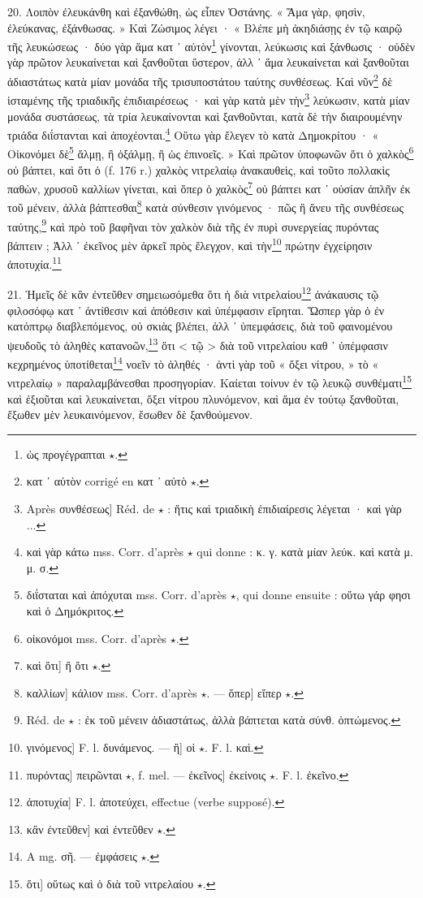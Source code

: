 \documentclass[a4paper, 11pt, oneside, polutonikogreek, french]{article}
\begin{document}
20. Λοιπὸν ἐλευκάνθη καὶ ἐξανθώθη, ὡς εἶπεν Ὀστάνης. « Ἅμα γὰρ, φησὶν, ἐλεύκανας, ἐξάνθωσας. » Καὶ Ζώσιμος λέγει · « Βλέπε μὴ ἀκηδιάσῃς ἐν τῷ καιρῷ τῆς λευκώσεως · δύο γὰρ ἅμα κατ ᾽ αὐτὸν\footnote{ὡς προγέγραπται $\star$.} γίνονται, λεύκωσις καὶ ξάνθωσις · οὐδὲν γὰρ πρῶτον λευκαίνεται καὶ ξανθοῦται ὕστερον, ἀλλ ᾽ ἅμα λευκαίνεται καὶ ξανθοῦται ἀδιαστάτως κατὰ μίαν μονάδα τῆς τρισυποστάτου ταύτης συνθέσεως. Καὶ νῦν\footnote{κατ ᾽ αὐτὸν corrigé en κατ ᾽ αὐτὸ $\star$.} δὲ ἱσταμένης τῆς τριαδικῆς ἐπιδιαιρέσεως · καὶ γὰρ κατὰ μὲν τὴν\footnote{Après συνθέσεως] Réd. de $\star$ : ἥτις καὶ τριαδικὴ ἐπιδιαίρεσις λέγεται · καὶ γὰρ ...} λεύκωσιν, κατὰ μίαν μονάδα συστάσεως, τὰ τρία λευκαίνονται καὶ ξανθοῦνται, κατὰ δὲ τὴν διαιρουμένην τριάδα διΐστανται καὶ ἀποχέονται.\footnote{καὶ γὰρ κάτω mss. Corr. d'après $\star$ qui donne : κ. γ. κατὰ μίαν λεύκ. καὶ κατὰ μ. μ. σ.} Οὕτω γὰρ ἔλεγεν τὸ κατὰ Δημοκρίτου · « Οἰκονόμει δὲ\footnote{διΐσταται καὶ ἀπόχυται mss. Corr. d'après $\star$, qui donne ensuite : οὕτω γάρ φησι καὶ ὁ Δημόκριτος.} ἅλμῃ, ἢ ὀξάλμῃ, ἢ ὡς ἐπινοεῖς. » Καὶ πρῶτον ὑποφωνῶν ὅτι ὁ χαλκὸς\footnote{οἰκονόμοι mss. Corr. d'après $\star$.} οὐ βάπτει, καὶ ὅτι ὁ (f. 176 r.) χαλκὸς νιτρελαίῳ ἀνακαυθεὶς, καὶ τοῦτο πολλακὶς παθὼν, χρυσοῦ καλλίων γίνεται, καὶ ὅπερ ὁ χαλκὸς\footnote{καὶ ὅτι] ἢ ὅτι $\star$.} οὐ βάπτει κατ ᾽ οὐσίαν ἁπλῆν ἐκ τοῦ μένειν, ἀλλὰ βάπτεσθαι\footnote{καλλίων] κάλιον mss. Corr. d'après $\star$. --- ὅπερ] εἴπερ $\star$.} κατὰ σύνθεσιν γινόμενος · πῶς ἢ ἄνευ τῆς συνθέσεως ταύτης,\footnote{Réd. de $\star$ : ἐκ τοῦ μένειν ἀδιαστάτως, ἀλλὰ βάπτεται κατὰ σύνθ. ὀπτώμενος.} καὶ πρὸ τοῦ βαφῆναι τὸν χαλκὸν διὰ τῆς ἐν πυρὶ συνεργείας πυρόντας βάπτειν ; Ἀλλ ᾽ ἐκεῖνος μὲν ἀρκεῖ πρὸς ἔλεγχον, καὶ τὴν\footnote{γινόμενος] F. l. δυνάμενος. --- ἢ] οἱ $\star$. F. l. καὶ.} πρώτην ἐγχείρησιν ἀποτυχία.\footnote{πυρόντας] πειρῶνται $\star$, f. mel. --- ἐκεῖνος] ἐκείνοις $\star$. F. l. ἐκεῖνο.}

21. Ἡμεῖς δὲ κἂν ἐντεῦθεν σημειωσόμεθα ὅτι ἡ διὰ νιτρελαίου\footnote{ἀποτυχία] F. l. ἀποτεύχει, effectue (verbe supposé).} ἀνάκαυσις τῷ φιλοσόφῳ κατ ᾽ ἀντίθεσιν καὶ ἀπόθεσιν καὶ ὑπέμφασιν εἴρηται. Ὥσπερ γὰρ ὁ ἐν κατόπτρῳ διαβλεπόμενος, οὐ σκιὰς βλέπει, ἀλλ ᾽ ὑπεμφάσεις, διὰ τοῦ φαινομένου ψευδοῦς τὸ ἀληθὲς κατανοῶν,\footnote{κἂν ἐντεῦθεν] καὶ ἐντεῦθεν $\star$.} ὅτι < τῷ > διὰ τοῦ νιτρελαίου καθ ᾽ ὑπέμφασιν κεχρημένος ὑποτίθεται\footnote{A mg. σῆ. --- ἐμφάσεις $\star$.} νοεῖν τὸ ἀληθές · ἀντὶ γὰρ τοῦ « ὄξει νίτρου, » τὸ « νιτρελαίῳ » παραλαμβάνεσθαι προσηγορίαν. Καίεται τοίνυν ἐν τῷ λευκῷ συνθέματι\footnote{ὅτι] οὕτως καὶ ὁ διὰ τοῦ νιτρελαίου $\star$.} καὶ ἐξιοῦται καὶ λευκαίνεται, ὄξει νίτρου πλυνόμενον, καὶ ἅμα ἐν τούτῳ ξανθοῦται, ἔξωθεν μὲν λευκαινόμενον, ἔσωθεν δὲ ξανθούμενον.
\end{document}
